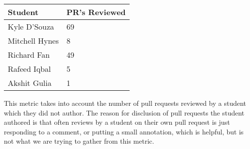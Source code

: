 \documentclass{article}
\begin{document}
\begin{table}[H]
  \centering
  \begin{tabular}{ll}
    \toprule
    \textbf{Student} & \textbf{PR's Reviewed}\\
    \midrule
    Kyle D'Souza & 69\\
    Mitchell Hynes & 8\\
    Richard Fan & 49\\
    Rafeed Iqbal & 5\\
    Akshit Gulia & 1\\
    \bottomrule
  \end{tabular}
\end{table}

This metric takes into account the number of pull requests reviewed
by a student which they did not author. The reason for disclusion of
pull requests the student authored is that often reviews by a student
on their own pull request is just responding to a comment, or putting
a small annotation, which is helpful, but is not what we are trying
to gather from this metric.
\end{document}
